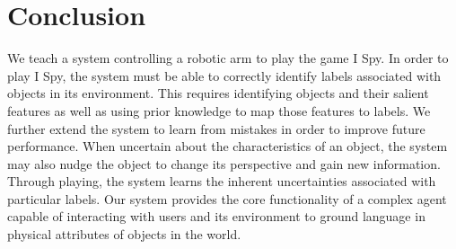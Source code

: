 \documentclass[11pt]{article}
\newcommand{\xxx}[1]{{\bf \color{red} #1}}
\begin{document}
\section{Conclusion}
We teach a system controlling a robotic arm to play the game I Spy.
In order to play I Spy, the system must be able to correctly identify labels
associated with objects in its environment. This requires identifying objects
and their salient features as well as using prior knowledge to map those features
to labels. We further extend the system to learn from mistakes in order to
improve future performance. When uncertain about the characteristics of an
object, the system may also nudge the object to change its perspective and
gain new information. Through playing, the system learns the inherent
uncertainties associated with particular labels. Our system provides the core
functionality of a complex agent capable of interacting with users and its
environment to ground language in physical attributes of objects in the world.



\end{document}
